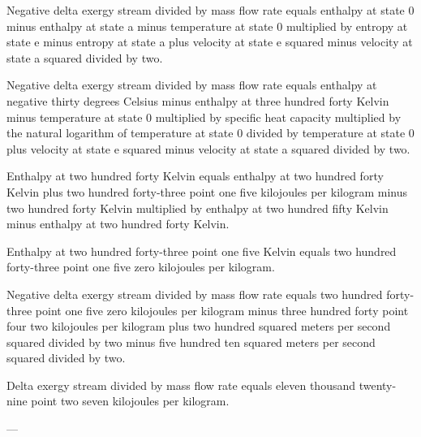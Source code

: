 Negative delta exergy stream divided by mass flow rate equals enthalpy at state 0 minus enthalpy at state a minus temperature at state 0 multiplied by entropy at state e minus entropy at state a plus velocity at state e squared minus velocity at state a squared divided by two.  

Negative delta exergy stream divided by mass flow rate equals enthalpy at negative thirty degrees Celsius minus enthalpy at three hundred forty Kelvin minus temperature at state 0 multiplied by specific heat capacity multiplied by the natural logarithm of temperature at state 0 divided by temperature at state 0 plus velocity at state e squared minus velocity at state a squared divided by two.  

Enthalpy at two hundred forty Kelvin equals enthalpy at two hundred forty Kelvin plus two hundred forty-three point one five kilojoules per kilogram minus two hundred forty Kelvin multiplied by enthalpy at two hundred fifty Kelvin minus enthalpy at two hundred forty Kelvin.  

Enthalpy at two hundred forty-three point one five Kelvin equals two hundred forty-three point one five zero kilojoules per kilogram.  

Negative delta exergy stream divided by mass flow rate equals two hundred forty-three point one five zero kilojoules per kilogram minus three hundred forty point four two kilojoules per kilogram plus two hundred squared meters per second squared divided by two minus five hundred ten squared meters per second squared divided by two.  

Delta exergy stream divided by mass flow rate equals eleven thousand twenty-nine point two seven kilojoules per kilogram.  

---